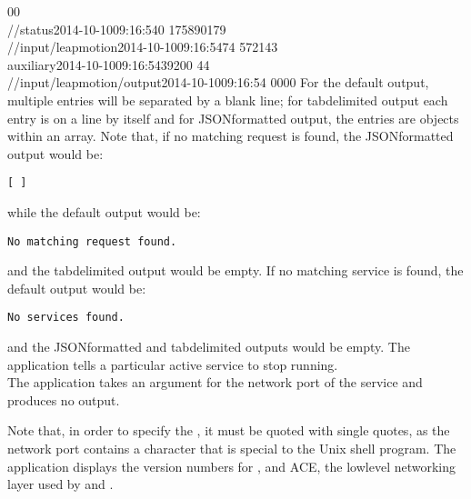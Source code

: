 0\pseudotab{}0\\
/\dollarService/status\pseudotab{}2014-10-10\pseudotab{}09:16:54\pseudotab{}0%
\pseudotab{}17589\pseudotab{}0\pseudotab{}179\\
/\serviceName/input/leapmotion\pseudotab{}2014-10-10\pseudotab{}09:16:54\pseudotab{}74%
\pseudotab{}5721\pseudotab{}4\pseudotab{}3\\
auxiliary\pseudotab{}2014-10-10\pseudotab{}09:16:54\pseudotab{}39\pseudotab{}200%
\pseudotab{}4\pseudotab{}4\\
/\serviceName/input/leapmotion/output\pseudotab{}2014-10-10\pseudotab{}09:16:54%
\pseudotab{}0\pseudotab{}0\pseudotab{}0\pseudotab{}0
\outputEnd{}
For the default output, multiple entries will be separated by a blank line; for
tab\longDash{}delimited output each entry is on a line by itself and for
JSON\longDash{}formatted output, the entries are objects within an array.
Note that, if no matching request is found, the JSON\longDash{}formatted output would be:
\outputBegin
\begin{verbatim}
[ ]
\end{verbatim}
\outputEnd{}
while the default output would be:
\outputBegin
\begin{verbatim}
No matching request found.
\end{verbatim}
\outputEnd{}
and the tab\longDash{}delimited output would be empty.
If no matching service is found, the default output would be:
\outputBegin
\begin{verbatim}
No services found.
\end{verbatim}
\outputEnd{}
and the JSON\longDash{}formatted and tab\longDash{}delimited outputs would be empty.
\condPage
{}
The application  tells a particular active service to stop
running.\\

The application takes an argument for the \yarp{} network port of the service and produces
no output.
\insertShortUtilityParameters{}

Note that, in order to specify the , it must be quoted
with single quotes, as the network port contains a character that is special to the Unix
shell program.
The application  displays the version numbers for \mplusm,
\yarp{} and ACE, the low\longDash{}level networking layer used by \mplusm{} and \yarp.\\

